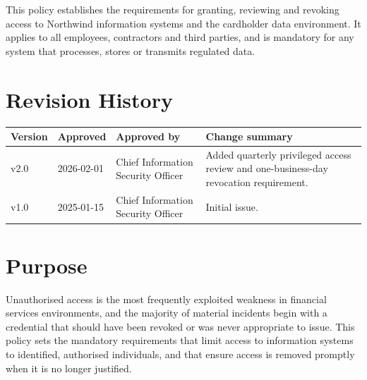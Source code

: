 \documentclass[11pt,a4paper]{article}
\begin{document}
\vspace{1em}
\begin{clcallout}
  \par\vspace{0.2em}
  This policy establishes the requirements for granting, reviewing and revoking
  access to Northwind information systems and the cardholder data environment.
  It applies to all employees, contractors and third parties, and is mandatory
  for any system that processes, stores or transmits regulated data.
\end{clcallout}

\vspace{1.2em}
\section*{Revision History}

\begin{tabularx}{\linewidth}{@{}>{\sffamily\small}l>{\sffamily\small}l>{\small}lX@{}}
  \toprule
  \sffamily\bfseries\small Version & \sffamily\bfseries\small Approved &
  \sffamily\bfseries\small Approved by & \sffamily\bfseries\small Change summary \\
  \midrule
  v2.0 & 2026-02-01 & Chief Information Security Officer &
    Added quarterly privileged access review and one-business-day revocation requirement. \\
  v1.0 & 2025-01-15 & Chief Information Security Officer & Initial issue. \\
  \bottomrule
\end{tabularx}

\clearpage
\renewcommand{\contentsname}{Contents}
\tableofcontents
\clearpage

\section{Purpose}
Unauthorised access is the most frequently exploited weakness in financial
services environments, and the majority of material incidents begin with a
credential that should have been revoked or was never appropriate to issue.
This policy sets the mandatory requirements that limit access to information
systems to identified, authorised individuals, and that ensure access is removed
promptly when it is no longer justified.
\end{document}
